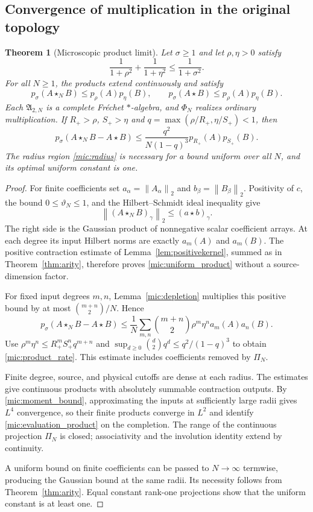 \documentclass[11pt,a4paper]{amsart}
\numberwithin{equation}{section}
\newtheorem{theorem}{Theorem}[section]
\theoremstyle{definition}
\theoremstyle{remark}
\newcommand{\Alg}{\mathfrak A}
\newcommand{\norm}[1]{\left\lVert#1\right\rVert}
\begin{document}
\subsection{Convergence of multiplication in the original topology}
\begin{theorem}[Microscopic product limit]\label{mic:algebra_limit}
Let $\sigma\ge1$ and let $\rho,\eta>0$ satisfy
\begin{equation}\label{mic:radius}
 \frac1{1+\rho^2}+\frac1{1+\eta^2}\le\frac1{1+\sigma^2}.
\end{equation}
For all $N\ge1$, the products extend continuously and satisfy
\begin{equation}\label{mic:uniform_product}
 p_\sigma(A\star_NB)\le p_\rho(A)p_\eta(B),\qquad
 p_\sigma(A\star B)\le p_\rho(A)p_\eta(B).
\end{equation}
Each $\Alg_{2,N}$ is a complete Fr\'echet $*$-algebra, and $\Phi_N$ realizes ordinary multiplication. If $R_+>\rho$, $S_+>\eta$ and
$q=\max(\rho/R_+,\eta/S_+)<1$, then
\begin{equation}\label{mic:product_rate}
 p_\sigma(A\star_NB-A\star B)
 \le\frac{q^2}{N(1-q)^3}p_{R_+}(A)p_{S_+}(B).
\end{equation}
The radius region \eqref{mic:radius} is necessary for a bound uniform over all $N$, and its optimal uniform constant is one.
\end{theorem}
\begin{proof}
For finite coefficients set $a_\alpha=\norm{A_\alpha}_2$ and $b_\beta=\norm{B_\beta}_2$. Positivity of $c$, the bound $0\le\vartheta_N\le1$, and the Hilbert--Schmidt ideal inequality give
\[
 \norm{(A\star_NB)_\gamma}_2\le(a\star b)_\gamma.
\]
The right side is the Gaussian product of nonnegative scalar coefficient arrays. At each degree its input Hilbert norms are exactly $a_m(A)$ and $a_m(B)$. The positive contraction estimate of Lemma~\ref{lem:positivekernel}, summed as in Theorem~\ref{thm:arity}, therefore proves \eqref{mic:uniform_product} without a source-dimension factor.

For fixed input degrees $m,n$, Lemma~\ref{mic:depletion} multiplies this positive bound by at most $\binom{m+n}{2}/N$. Hence
\[
 p_\sigma(A\star_NB-A\star B)
 \le\frac1N\sum_{m,n}\binom{m+n}{2}\rho^m\eta^n a_m(A)a_n(B).
\]
Use $\rho^m\eta^n\le R_+^mS_+^n q^{m+n}$ and
$\sup_{d\ge0}\binom d2q^d\le q^2/(1-q)^3$ to obtain \eqref{mic:product_rate}. This estimate includes coefficients removed by $\Pi_N$.

Finite degree, source, and physical cutoffs are dense at each radius. The estimates give continuous products with absolutely summable contraction outputs. By \eqref{mic:moment_bound}, approximating the inputs at sufficiently large radii gives $L^4$ convergence, so their finite products converge in $L^2$ and identify \eqref{mic:evaluation_product} on the completion. The range of the continuous projection $\Pi_N$ is closed; associativity and the involution identity extend by continuity.

A uniform bound on finite coefficients can be passed to $N\to\infty$ termwise, producing the Gaussian bound at the same radii. Its necessity follows from Theorem~\ref{thm:arity}. Equal constant rank-one projections show that the uniform constant is at least one.
\end{proof}
\end{document}
